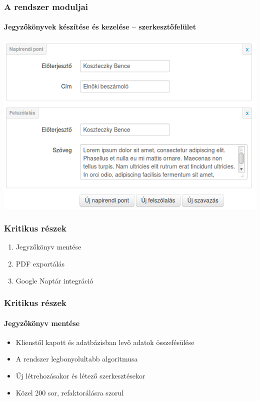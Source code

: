 \documentclass[12pt]{beamer}
\begin{document}
\begin{frame}
    \frametitle{A rendszer moduljai}
    \framesubtitle{Jegyzőkönyvek készítése és kezelése -- szerkesztőfelület}
    
    \includegraphics[width=\textwidth,center]{jegyzokonyv-szerkesztes.png}
\end{frame}

\begin{frame}
    \frametitle{Kritikus részek}
    
    \Large
    \begin{enumerate}
        \item Jegyzőkönyv mentése
        \item PDF exportálás
        \item Google Naptár integráció
    \end{enumerate}
\end{frame}

\begin{frame}
    \frametitle{Kritikus részek}
    \framesubtitle{Jegyzőkönyv mentése}

    \large    
    \begin{itemize}
        \item Klienstől kapott és adatbázisban levő adatok összefésülése
        \item A rendszer legbonyolultabb algoritmusa
        \item Új létrehozásakor és létező szerkesztésekor
        \item Közel 200 sor, refaktorálásra szorul
    \end{itemize}
\end{frame}
\end{document}
